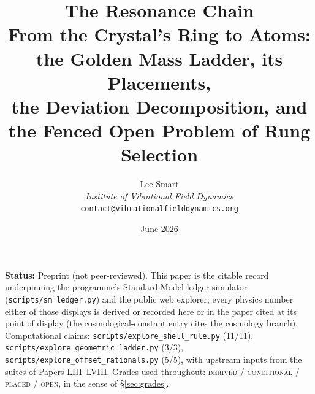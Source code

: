 \documentclass[12pt]{article}
\title{The Resonance Chain\\[6pt]
\large From the Crystal's Ring to Atoms: the Golden Mass Ladder, its Placements,\\ the Deviation Decomposition, and the Fenced Open Problem of Rung Selection}
\author{Lee Smart\\ \textit{Institute of Vibrational Field Dynamics}\\ \texttt{contact@vibrationalfielddynamics.org}}
\date{June 2026}
\theoremstyle{definition}
\theoremstyle{remark}
\begin{document}
\maketitle

\noindent\textbf{Status:} Preprint (not peer-reviewed). This paper is the citable record underpinning the programme's Standard-Model ledger simulator (\texttt{scripts/sm\_ledger.py}) and the public web explorer; every physics number either of those displays is derived or recorded here or in the paper cited at its point of display (the cosmological-constant entry cites the cosmology branch). Computational claims: \texttt{scripts/explore\_shell\_rule.py} (11/11), \texttt{scripts/explore\_geometric\_ladder.py} (3/3), \texttt{scripts/explore\_offset\_rationals.py} (5/5), with upstream inputs from the suites of Papers LIII--LVIII. Grades used throughout: \textsc{derived} / \textsc{conditional} / \textsc{placed} / \textsc{open}, in the sense of \S\ref{sec:grades}.
\end{document}
